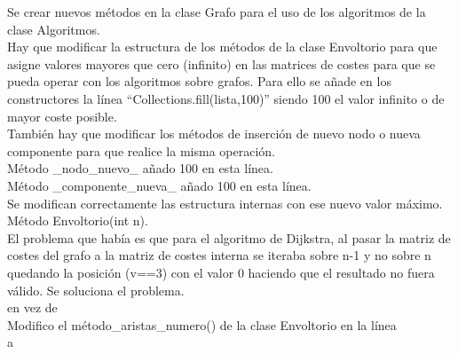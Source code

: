 \begin{itemize}
Se crear nuevos métodos en la clase Grafo para el uso de los algoritmos de la clase Algoritmos.\\

Hay que modificar la estructura de los métodos de la clase Envoltorio para que asigne valores mayores que cero (infinito) en las matrices de costes para que se pueda operar con los algoritmos sobre grafos. Para ello se añade en los constructores la línea ``Collections.fill(lista,100)'' siendo 100 el valor infinito o de mayor coste posible.\\

También hay que modificar los métodos de inserción de nuevo nodo o nueva componente para que realice la misma operación.\\

Método \_nodo\_nuevo\_ añado 100 en esta línea.\\



Método \_componente\_nueva\_ añado 100 en esta línea.\\



Se modifican correctamente las estructura internas con ese nuevo valor máximo.\\

Método Envoltorio(int n).\\



El problema que había es que para el algoritmo de Dijkstra, al pasar la matriz de costes del grafo a la matriz de costes interna se iteraba sobre n-1 y no sobre n quedando la posición (v==3) con el valor 0 haciendo que el resultado no fuera válido. Se soluciona el problema. \\



en vez de\\



Modifico el método\_aristas\_numero() de la clase Envoltorio en la línea\\



a \\




\end{itemize}
